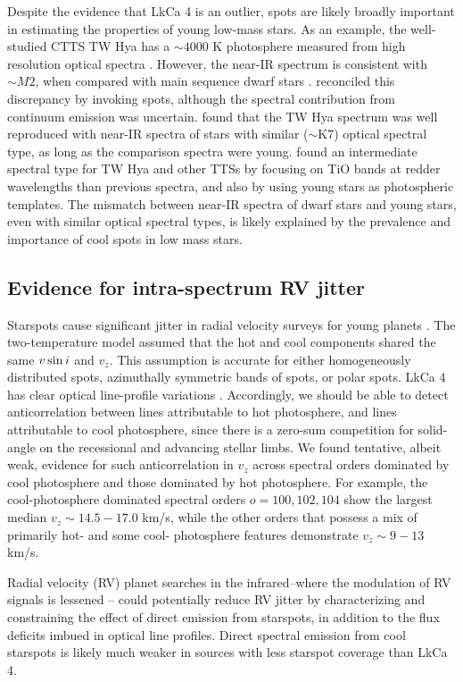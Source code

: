 \documentclass[twocolumn]{emulateapj}%
\begin{document}
Despite the evidence that LkCa 4 is an outlier, spots are likely broadly important in estimating the properties of young low-mass stars. As an example, the well-studied CTTS TW Hya has a $\sim 4000$ K photosphere measured from high resolution optical spectra \citep[e.g.][]{yang05}.  However, the near-IR spectrum is consistent with $\sim M2$, when compared with main sequence dwarf stars \citep{vacca11}.  \citet{debes13} reconciled this discrepancy by invoking spots, although the spectral contribution from continuum emission was uncertain.  \citet{mcclure13} found that the TW Hya spectrum was well reproduced with near-IR spectra of stars with similar ($\sim$K7) optical spectral type, as long as the comparison spectra were young.   \citet{herczeg14} found an intermediate spectral type for TW Hya and other TTSs by focusing on TiO bands at redder wavelengths than previous spectra, and also by using young stars as photospheric templates.  The mismatch between near-IR spectra of dwarf stars and young stars, even with similar optical spectral types, is likely explained by the prevalence and importance of cool spots in low mass stars.

\subsection{Evidence for intra-spectrum RV jitter}
Starspots cause significant jitter in radial velocity surveys for young planets \citep[e.g.][]{donati14, robertson14}.  The two-temperature model assumed that the hot and cool components shared the same $v \sin i$ and $v_z$.  This assumption is accurate for either homogeneously distributed spots, azimuthally symmetric bands of spots, or polar spots.  LkCa 4 has clear optical line-profile variations \citep{nguyen12, donati14}.  Accordingly, we should be able to detect anticorrelation between lines attributable to hot photosphere, and lines attributable to cool photosphere, since there is a zero-sum competition for solid-angle on the recessional and advancing stellar limbs.  We found tentative, albeit weak, evidence for such anticorrelation in $v_z$ across spectral orders dominated by cool photosphere and those dominated by hot photosphere.  For example, the cool-photosphere dominated spectral orders $o = 100, 102, 104$ show the largest median $v_z\sim14.5-17.0$ km/s, while the other orders that possess a mix of primarily hot- and some cool- photosphere features demonstrate $v_z\sim9-13$ km/s.

Radial velocity (RV) planet searches in the infrared--where the modulation of RV signals is lessened \citep[\emph{e.g.}][]{prato08}-- could potentially reduce RV jitter by characterizing and constraining the effect of direct emission from starspots, in addition to the flux deficits imbued in optical line profiles.  Direct spectral emission from cool starspots is likely much weaker in sources with less starspot coverage than LkCa 4.
\end{document}

